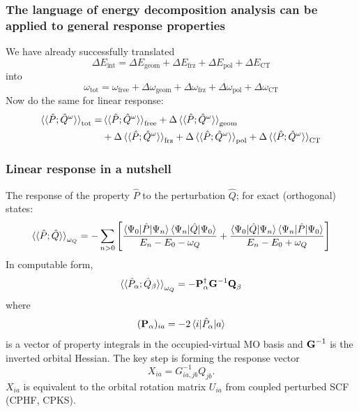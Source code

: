 \documentclass[%
    xcolor=usenames,dvipsnames,svgnames%
]{beamer}
\begin{document}
\begin{frame}
  \frametitle{The language of energy decomposition analysis can be applied to general response properties}
  We have already successfully translated
  \begin{equation*}
    \Delta E_{\text{int}} = \Delta E_{\text{geom}} + \Delta E_{\text{frz}} + \Delta E_{\text{pol}} + \Delta E_{\text{CT}}
  \end{equation*}
  into
  \begin{equation*}
    \omega_{\text{tot}} = \omega_{\text{free}} + \Delta \omega_{\text{geom}} + \Delta \omega_{\text{frz}} + \Delta \omega_{\text{pol}} + \Delta \omega_{\text{CT}}
  \end{equation*}
  Now do the same for linear response:
  \begin{equation*}
    \begin{aligned}
      \braket{\braket{\hat{P};\hat{Q}^{\omega}}}_{\text{tot}} = &\braket{\braket{\hat{P};\hat{Q}^{\omega}}}_{\text{free}} + \Delta \braket{\braket{\hat{P};\hat{Q}^{\omega}}}_{\text{geom}} \\
      &+ \Delta \braket{\braket{\hat{P};\hat{Q}^{\omega}}}_{\text{frz}} + \Delta \braket{\braket{\hat{P};\hat{Q}^{\omega}}}_{\text{pol}} + \Delta \braket{\braket{\hat{P};\hat{Q}^{\omega}}}_{\text{CT}}
    \end{aligned}
  \end{equation*}
\end{frame}

\begin{frame}
  \frametitle{Linear response in a nutshell}
  The response of the property \(\hat{P}\) to the perturbation \(\hat{Q}\); for exact (orthogonal) states:
  \begin{equation*}
    \braket{\braket{\hat{P};\hat{Q}}}_{\omega_{Q}} = - \sum_{n>0} \left[ \frac{\braket{\Psi_{0}|\hat{P}|\Psi_{n}}\braket{\Psi_{n}|\hat{Q}|\Psi_{0}}}{E_{n} - E_{0} - \omega_{Q}} + \frac{\braket{\Psi_{0}|\hat{Q}|\Psi_{n}}\braket{\Psi_{n}|\hat{P}|\Psi_{0}}}{E_{n} - E_{0} + \omega_{Q}} \right]
  \end{equation*}
  In computable form,
  \begin{equation*}
    \braket{\braket{\hat{P}_{\alpha};\hat{Q}_{\beta}}}_{\omega_{Q}} = - \boldsymbol{\mathbf{P}}_{\alpha}^{\dagger} \boldsymbol{\mathbf{G}}^{-1} \boldsymbol{\mathbf{Q}}_{\beta}
  \end{equation*}
  where
  \begin{equation*}
    (\boldsymbol{\mathbf{P}}_{\alpha})_{ia} = -2 \braket{ i | \hat{P}_{\alpha} | a }
  \end{equation*}
  is a vector of property integrals in the occupied-virtual MO basis and \(\boldsymbol{\mathbf{G}}^{-1}\) is the inverted orbital Hessian. The key step is forming the response vector
  \begin{equation*}
    X_{ia} = G_{ia,jb}^{-1} Q_{jb}.
  \end{equation*}
  \(X_{ia}\) is equivalent to the orbital rotation matrix \(U_{ia}\) from coupled perturbed SCF (CPHF, CPKS).
\end{frame}
\end{document}
